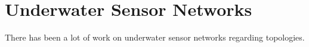 \section{Underwater Sensor Networks}
There has been a lot of work on underwater sensor networks regarding topologies.